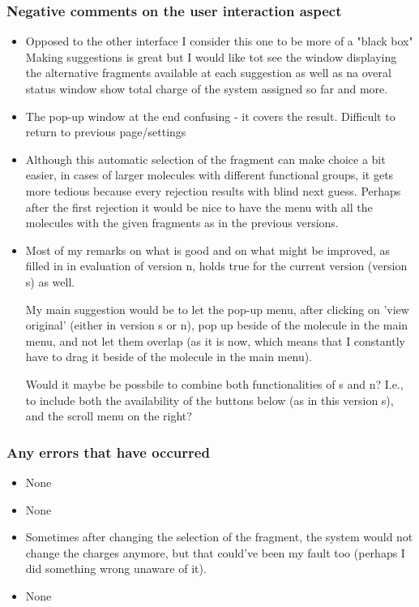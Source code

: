 \subsubsection{Negative comments on the user interaction aspect}
\begin{itemize}
\item Opposed to the other interface I consider this one to be more of a "black box" Making suggestions is great but I would like tot see the window displaying the alternative fragments available at each suggestion as well as na overal status window show total charge of the system assigned so far and more. 

\item The pop-up window at the end confusing - it covers the result. Difficult to return to previous page/settings

\item Although this automatic selection of the fragment can make choice a bit easier, in cases of larger molecules with different functional groups, it gets more tedious because every rejection results with blind next guess. Perhaps after the first rejection it would be nice to have the menu with all the molecules with the given fragments as in the previous versions.

\item Most of my remarks on what is good and on what might be improved, as filled in in evaluation of version n, holds true for the current version (version s) as well.

My main suggestion would be to let the pop-up menu, after clicking on 'view original' (either in version s or n), pop up beside of the molecule in the main menu, and not let them overlap (as it is now, which means that I constantly have to drag it beside of the molecule in the main menu).

Would it maybe be possbile to combine both functionalities of s and n? I.e., to include both the availability of the buttons below (as in this version s), and the scroll menu on the right?

\end{itemize}


\subsubsection{Any errors that have occurred}
\begin{itemize}
\item None

\item None

\item Sometimes after changing the selection of the fragment, the system would not change the charges anymore, but that could've been my fault too (perhaps I did something wrong unaware of it).

\item None

\end{itemize}


